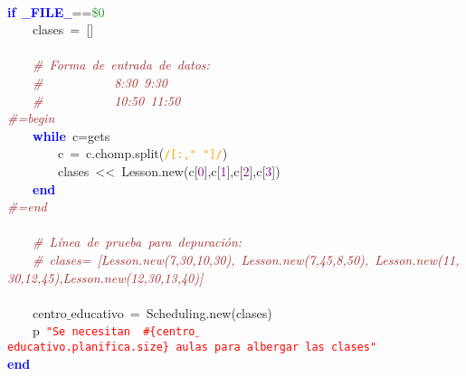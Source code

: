 \mbox{} \\
\mbox{}\textbf{\textcolor{Blue}{if}}\ \textbf{\textcolor{Blue}{$\_$$\_$FILE$\_$$\_$}}\textcolor{BrickRed}{==}\textcolor{ForestGreen}{\$0} \\
\mbox{}\ \ \ \ clases\ \textcolor{BrickRed}{=}\ \textcolor{BrickRed}{[]} \\
\mbox{}\ \ \ \  \\
\mbox{}\ \ \ \ \textit{\textcolor{Brown}{\#\ Forma\ de\ entrada\ de\ datos:\ }} \\
\mbox{}\ \ \ \ \textit{\textcolor{Brown}{\#\ \ \ \ \ \ \ \ \ \ \ 8:30\ 9:30}} \\
\mbox{}\ \ \ \ \textit{\textcolor{Brown}{\#\ \ \ \ \ \ \ \ \ \ \ 10:50\ 11:50\ \ \ \ \ \ \ }} \\
\mbox{}\textit{\textcolor{Brown}{\#=begin}} \\
\mbox{}\ \ \ \ \textbf{\textcolor{Blue}{while}}\ c\textcolor{BrickRed}{=}gets \\
\mbox{}\ \ \ \ \ \ \ \ c\ \textcolor{BrickRed}{=}\ c\textcolor{BrickRed}{.}chomp\textcolor{BrickRed}{.}split\textcolor{BrickRed}{(}\texttt{\textcolor{Orange}{/[:,"{}\ "{}]/}}\textcolor{BrickRed}{)} \\
\mbox{}\ \ \ \ \ \ \ \ clases\ \textcolor{BrickRed}{\textless{}\textless{}}\ Lesson\textcolor{BrickRed}{.}new\textcolor{BrickRed}{(}c\textcolor{BrickRed}{[}\textcolor{Purple}{0}\textcolor{BrickRed}{],}c\textcolor{BrickRed}{[}\textcolor{Purple}{1}\textcolor{BrickRed}{],}c\textcolor{BrickRed}{[}\textcolor{Purple}{2}\textcolor{BrickRed}{],}c\textcolor{BrickRed}{[}\textcolor{Purple}{3}\textcolor{BrickRed}{])} \\
\mbox{}\ \ \ \ \textbf{\textcolor{Blue}{end}} \\
\mbox{}\textit{\textcolor{Brown}{\#=end}} \\
\mbox{}\ \ \ \  \\
\mbox{}\ \ \ \ \textit{\textcolor{Brown}{\#\ Línea\ de\ prueba\ para\ depuración:}} \\
\mbox{}\ \ \ \ \textit{\textcolor{Brown}{\#\ clases=\ [Lesson.new(7,30,10,30),\ Lesson.new(7,45,8,50),\ Lesson.new(11,30,12,45),Lesson.new(12,30,13,40)]}} \\
\mbox{}\ \ \ \ \ \ \ \  \\
\mbox{}\ \ \ \ centro$\_$educativo\ \textcolor{BrickRed}{=}\ Scheduling\textcolor{BrickRed}{.}new\textcolor{BrickRed}{(}clases\textcolor{BrickRed}{)} \\
\mbox{}\ \ \ \ p\ \texttt{\textcolor{Red}{"{}Se\ necesitan\ \ \#\{centro$\_$educativo.planifica.size\}\ aulas\ para\ albergar\ las\ clases"{}}} \\
\mbox{}\textbf{\textcolor{Blue}{end}}
